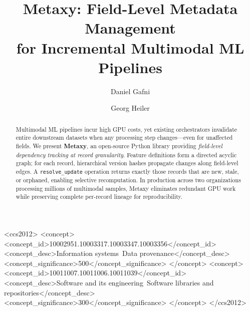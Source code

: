 \documentclass[sigconf]{acmart}
\begin{document}
\title{Metaxy: Field-Level Metadata Management\\for Incremental Multimodal ML Pipelines}

\author{Daniel Gafni}

\author{Georg Heiler}

\begin{abstract}
Multimodal ML pipelines incur high GPU costs, yet existing orchestrators invalidate entire downstream datasets when any processing step changes---even for unaffected fields.
We present \textbf{Metaxy}, an open-source Python library providing \emph{field-level dependency tracking at record granularity}.
Feature definitions form a directed acyclic graph; for each record, hierarchical version hashes propagate changes along field-level edges.
A \texttt{resolve\_update} operation returns exactly those records that are new, stale, or orphaned, enabling selective recomputation.
In production across two organizations processing millions of multimodal samples, Metaxy eliminates redundant GPU work while preserving complete per-record lineage for reproducibility.
\end{abstract}

\begin{CCSXML}
<ccs2012>
   <concept>
       <concept_id>10002951.10003317.10003347.10003356</concept_id>
       <concept_desc>Information systems~Data provenance</concept_desc>
       <concept_significance>500</concept_significance>
   </concept>
   <concept>
       <concept_id>10011007.10011006.10011039</concept_id>
       <concept_desc>Software and its engineering~Software libraries and repositories</concept_desc>
       <concept_significance>300</concept_significance>
   </concept>
</ccs2012>
\end{CCSXML}



\maketitle
\end{document}
